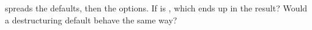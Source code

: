 \begin{ponder} spreads the defaults, then the options. If  is , which  ends up in the result? Would a destructuring default behave the same way?\end{ponder}
